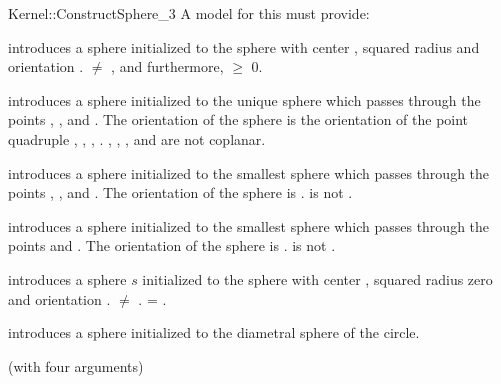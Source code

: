 \begin{ccRefFunctionObjectConcept}{Kernel::ConstructSphere_3}
A model for this must provide:


        {introduces a sphere initialized to the sphere with center ,
        squared radius  and orientation
        .
        \ccPrecond {} $\neq$ , and furthermore,
                    $\geq$ 0.}

        {introduces a sphere initialized to the unique sphere which passes
        through the points , ,  and . The
        orientation of the sphere is the orientation of the point quadruple
        , , , .
        \ccPrecond {}, , , and  are not coplanar.}


      {introduces a sphere initialized to the smallest sphere which passes
      through the points , , and . The orientation of
        the sphere is . \ccPrecond {} is not
        .}

        {introduces a sphere initialized to the smallest sphere which passes
        through the points  and . The orientation of
        the sphere is . \ccPrecond {} is not
        .}


      {introduces a sphere $s$ initialized to the sphere with center 
        , squared radius zero and orientation .
        \ccPrecond {} $\neq$ .
        \ccPostcond {} = .}

      {introduces a sphere initialized to the diametral sphere of
        the circle.}

\ccRefines
{} (with four arguments)

\ccSeeAlso
{}\\
\end{ccRefFunctionObjectConcept}
